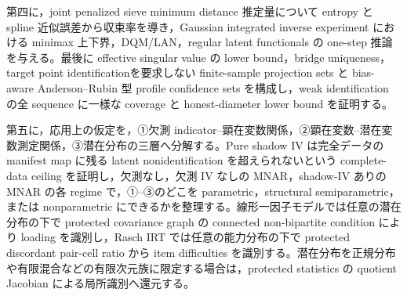\documentclass[11pt,a4paper]{ltjsarticle}
\theoremstyle{remark}
\begin{document}
\begin{tcolorbox}[colback=softblue,colframe=accent,boxrule=.8pt,arc=2mm]
第四に，joint penalized sieve minimum distance 推定量について entropy と spline 近似誤差から収束率を導き，Gaussian integrated inverse experiment における minimax 上下界，DQM/LAN，regular latent functionals の one-step 推論を与える。最後に effective singular value の lower bound，bridge uniqueness，target point identificationを要求しない finite-sample projection sets と bias-aware Anderson--Rubin 型 profile confidence sets を構成し，weak identification の全 sequence に一様な coverage と honest-diameter lower bound を証明する。

第五に，応用上の仮定を，①欠測 indicator--顕在変数関係，②顕在変数--潜在変数測定関係，③潜在分布の三層へ分解する。Pure shadow IV は完全データの manifest map に残る latent nonidentification を超えられないという complete-data ceiling を証明し，欠測なし，欠測 IV なしの MNAR，shadow-IV ありの MNAR の各 regime で，①--③のどこを parametric，structural semiparametric，または nonparametric にできるかを整理する。線形一因子モデルでは任意の潜在分布の下で protected covariance graph の connected non-bipartite condition により loading を識別し，Rasch IRT では任意の能力分布の下で protected discordant pair-cell ratio から item difficulties を識別する。潜在分布を正規分布や有限混合などの有限次元族に限定する場合は，protected statistics の quotient Jacobian による局所識別へ還元する。
\end{tcolorbox}
\end{document}
